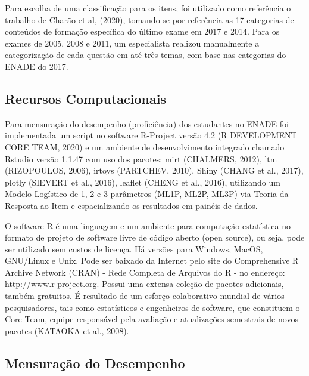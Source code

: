 \documentclass[12pt]{article}
\begin{document}
Para escolha de uma classificação para os itens, foi utilizado como referência o trabalho de Charão et al, (2020), tomando-se por referência as 17 categorias de conteúdos de formação específica do último exame em 2017 e 2014. Para os exames de 2005, 2008 e 2011, um especialista realizou manualmente a categorização de cada questão em até três temas, com base nas categorias do ENADE do 2017. 



\subsection{Recursos Computacionais}
\label{sec:metbet}

Para mensuração do desempenho (proficiência) dos estudantes no ENADE foi implementada um script no software R-Project versão 4.2 (R DEVELOPMENT CORE TEAM, 2020) e um ambiente de desenvolvimento integrado chamado Rstudio versão 1.1.47 com uso dos pacotes: mirt (CHALMERS, 2012), ltm (RIZOPOULOS, 2006), irtoys (PARTCHEV, 2010), Shiny (CHANG et al., 2017), plotly (SIEVERT et al., 2016), leaflet (CHENG et al., 2016), utilizando um Modelo Logístico de 1, 2 e 3 parâmetros (ML1P, ML2P, ML3P) via Teoria da Resposta ao Item e espacializando os resultados em painéis de dados.


O software R é uma linguagem e um ambiente para computação estatística no formato de projeto de software livre de código aberto (open source), ou seja, pode ser utilizado sem custos de licença. Há versões para Windows, MacOS, GNU/Linux e Unix. Pode ser baixado da Internet pelo site do Comprehensive R Archive Network (CRAN) - Rede Completa de Arquivos do R - no endereço: http://www.r-project.org. Possui uma extensa coleção de pacotes adicionais, também gratuitos. É resultado de um esforço colaborativo mundial de vários pesquisadores, tais como estatísticos e engenheiros de software, que constituem o Core Team, equipe responsável pela avaliação e atualizações semestrais de novos pacotes (KATAOKA et al., 2008).




\subsection{Mensuração do Desempenho}
\end{document}
